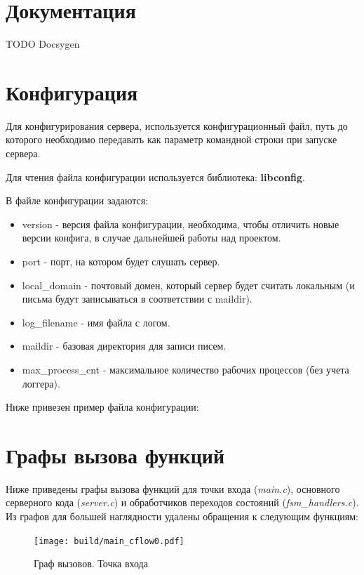 \documentclass[a4paper,12pt]{report}
\begin{document}
\section{Документация}
TODO Docsygen

\section{Конфигурация}
Для конфигурирования сервера, используется конфигурационный файл, путь до которого необходимо передавать как параметр командной строки при запуске сервера. 

Для чтения файла конфигурации используется библиотека: \textbf{libconfig}.

В файле конфигурации задаются: 
\begin{itemize}
	\item version - версия файла конфигурации, необходима, чтобы отличить новые версии конфига, в случае дальнейшей работы над проектом.  
	\item port - порт, на котором будет слушать сервер.  
	\item local\_domain - почтовый домен, который сервер будет считать локальным (и письма будут записываться в соответствии с maildir).
	\item log\_filename - имя файла с логом. 
	\item maildir - базовая директория для записи писем.
	\item max\_process\_cnt - максимальное количество рабочих процессов (без учета логгера). 
\end{itemize}


Ниже привезен пример файла конфигурации:


\section{Графы вызова функций}
Ниже приведены графы вызова функций для точки входа (\textit{main.c}), основного серверного кода (\textit{server.c}) и обработчиков переходов состояний (\textit{fsm\_handlers.c}). Из графов для большей наглядности удалены обращения к следующим функциям: 



\begin{figure}[H]
	\texttt{[image: build/main\_cflow0.pdf]}
	\caption{Граф вызовов. Точка входа}
	\label{fig:cflow1}
\end{figure}
\end{document}
